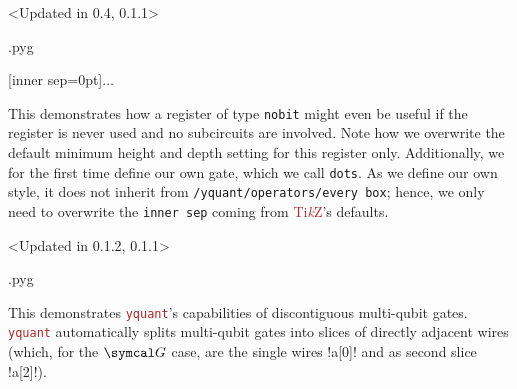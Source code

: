 \documentclass{scrartcl}
\makeatletter
\newenvironment{codeexample}{%
   \VerbatimEnvironment%
   \let\FVB@VerbatimOut\minted@FVB@VerbatimOut
   \let\FVE@VerbatimOut\minted@FVE@VerbatimOut
   \minted@configlang{tex}%
   \minted@fvset
   \begin{VerbatimOut}[codes={\catcode`\^^I=12},firstline,lastline]{\minted@jobname.pyg}%
}{
   \end{VerbatimOut}%
   \minted@langlinenoson%
   \savebox\codeexamplebox{ \minted@jobname.pyg}%
   \ifdim\wd\codeexamplebox>\dimexpr.5\linewidth-3mm\relax%
      \wd\codeexamplebox=.5\linewidth%
   \else%
      \wd\codeexamplebox=\dimexpr\wd\codeexamplebox+3mm\relax%
   \fi%
   \noindent\begin{minipage}{\wd\codeexamplebox}%
      \centering%
      \usebox\codeexamplebox%
   \end{minipage}%
   \begin{minipage}{\dimexpr\linewidth-\wd\codeexamplebox\relax}%
      \expandafter\minted@pygmentize\expandafter{\minted@lang}%
   \end{minipage}%
   \minted@langlinenosoff%
   \par%
}
\def\TikZ{\textcolor{brown}{Ti\textit kZ}}
\def\pkg#1{\textcolor{brown}{\texttt{#1}}}
\def\ttlink{\link\texttt}
\def\Yquant{\pkg{yquant}}
\makeatother
\begin{document}
               \begin{example}<Updated in 0.4, 0.1.1>
                  \begin{codeexample}
[inner sep=0pt]{$\dots$}
                  \end{codeexample}
                  This demonstrates how a register of type \ttlink{nobit} might even be useful if the register is never used and no subcircuits are involved.
                  Note how we overwrite the default minimum height and depth setting for this register only.
                  Additionally, we for the first time define our own gate, which we call \texttt{dots}.
                  As we define our own style, it does not inherit from \ttlink{/yquant/operators/every box}; hence, we only need to overwrite the \texttt{inner sep} coming from \TikZ's defaults.
               \end{example}

               \clearpage
               \begin{example}<Updated in 0.1.2, 0.1.1>
                  \begin{codeexample}
                  \end{codeexample}
                  This demonstrates \Yquant's capabilities of discontiguous multi\hyp qubit gates.
                  \Yquant{} automatically splits multi\hyp qubit gates into slices of directly adjacent wires (which, for the $\symcal G$ case, are the single wires \yquant!a[0]! and as second slice \yquant!a[2]!).
               \end{example}
\end{document}

